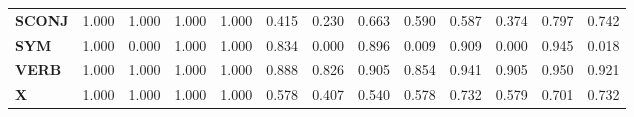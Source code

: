 \begin{table}
\begin{tabular}{|l||l||l||l||l||l||l||l||l||l||l||l||l|}
\textbf{SCONJ} & 1.000 & 1.000 & 1.000 & 1.000 & 0.415 & 0.230 & 0.663 & 0.590 & 0.587 & 0.374 & 0.797 & 0.742 \\
\textbf{SYM} & 1.000 & 0.000 & 1.000 & 1.000 & 0.834 & 0.000 & 0.896 & 0.009 & 0.909 & 0.000 & 0.945 & 0.018 \\
\textbf{VERB} & 1.000 & 1.000 & 1.000 & 1.000 & 0.888 & 0.826 & 0.905 & 0.854 & 0.941 & 0.905 & 0.950 & 0.921 \\
\textbf{X} & 1.000 & 1.000 & 1.000 & 1.000 & 0.578 & 0.407 & 0.540 & 0.578 & 0.732 & 0.579 & 0.701 & 0.732 \\
\bottomrule
\end{tabular}
\end{table}
